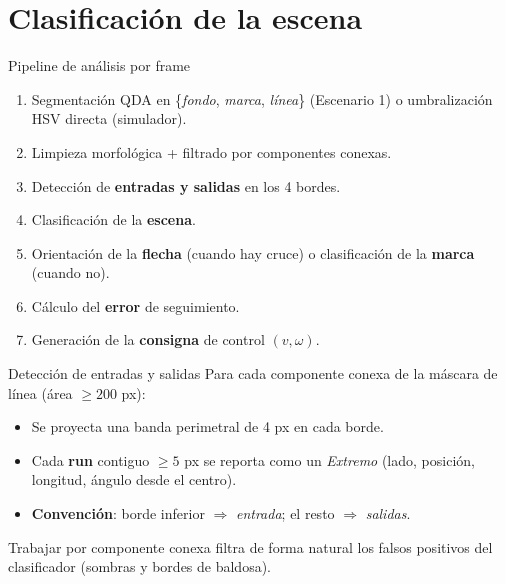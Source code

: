 \section{Clasificación de la escena}

\begin{frame}{Pipeline de análisis por frame}
\begin{enumerate}\setlength\itemsep{2pt}
  \item Segmentación QDA en \{\textit{fondo}, \textit{marca}, \textit{línea}\} (Escenario 1) o umbralización HSV directa (simulador).
  \item Limpieza morfológica + filtrado por componentes conexas.
  \item Detección de \textbf{entradas y salidas} en los 4 bordes.
  \item Clasificación de la \textbf{escena}.
  \item Orientación de la \textbf{flecha} (cuando hay cruce) o clasificación de la \textbf{marca} (cuando no).
  \item Cálculo del \textbf{error} de seguimiento.
  \item Generación de la \textbf{consigna} de control $(v,\omega)$.
\end{enumerate}
\end{frame}

\begin{frame}{Detección de entradas y salidas}
Para cada componente conexa de la máscara de línea (área $\geq 200$ px):
\begin{itemize}
  \item Se proyecta una banda perimetral de 4 px en cada borde.
  \item Cada \textbf{run} contiguo $\geq 5$ px se reporta como un \textit{Extremo} (lado, posición, longitud, ángulo desde el centro).
  \item \textbf{Convención}: borde inferior $\Rightarrow$ \textit{entrada}; el resto $\Rightarrow$ \textit{salidas}.
\end{itemize}

Trabajar por componente conexa filtra de forma natural los falsos positivos del clasificador (sombras y bordes de baldosa).
\end{frame}

